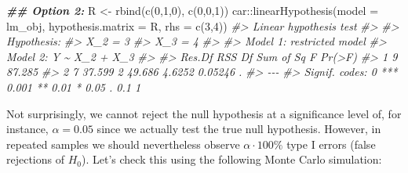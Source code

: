 \documentclass[
  14pt,
]{memoir}
\newenvironment{Shaded}{\begin{snugshade}}{\end{snugshade}}
\newcommand{\AttributeTok}[1]{\textcolor[rgb]{0.77,0.63,0.00}{#1}}
\newcommand{\CommentTok}[1]{\textcolor[rgb]{0.56,0.35,0.01}{\textit{#1}}}
\newcommand{\DecValTok}[1]{\textcolor[rgb]{0.00,0.00,0.81}{#1}}
\newcommand{\DocumentationTok}[1]{\textcolor[rgb]{0.56,0.35,0.01}{\textbf{\textit{#1}}}}
\newcommand{\FunctionTok}[1]{\textcolor[rgb]{0.00,0.00,0.00}{#1}}
\newcommand{\NormalTok}[1]{#1}
\newcommand{\OtherTok}[1]{\textcolor[rgb]{0.56,0.35,0.01}{#1}}
\newcommand{\SpecialCharTok}[1]{\textcolor[rgb]{0.00,0.00,0.00}{#1}}
\begin{document}
\begin{Shaded}
\begin{Highlighting}[]
\DocumentationTok{\#\# Option 2:}
\NormalTok{R }\OtherTok{\textless{}{-}} \FunctionTok{rbind}\NormalTok{(}\FunctionTok{c}\NormalTok{(}\DecValTok{0}\NormalTok{,}\DecValTok{1}\NormalTok{,}\DecValTok{0}\NormalTok{),}
           \FunctionTok{c}\NormalTok{(}\DecValTok{0}\NormalTok{,}\DecValTok{0}\NormalTok{,}\DecValTok{1}\NormalTok{))}
\NormalTok{car}\SpecialCharTok{::}\FunctionTok{linearHypothesis}\NormalTok{(}\AttributeTok{model =}\NormalTok{ lm\_obj, }
                      \AttributeTok{hypothesis.matrix =}\NormalTok{ R, }
                      \AttributeTok{rhs =} \FunctionTok{c}\NormalTok{(}\DecValTok{3}\NormalTok{,}\DecValTok{4}\NormalTok{))}
\CommentTok{\#\textgreater{} Linear hypothesis test}
\CommentTok{\#\textgreater{} }
\CommentTok{\#\textgreater{} Hypothesis:}
\CommentTok{\#\textgreater{} X\_2 = 3}
\CommentTok{\#\textgreater{} X\_3 = 4}
\CommentTok{\#\textgreater{} }
\CommentTok{\#\textgreater{} Model 1: restricted model}
\CommentTok{\#\textgreater{} Model 2: Y \textasciitilde{} X\_2 + X\_3}
\CommentTok{\#\textgreater{} }
\CommentTok{\#\textgreater{}   Res.Df    RSS Df Sum of Sq      F  Pr(\textgreater{}F)  }
\CommentTok{\#\textgreater{} 1      9 87.285                              }
\CommentTok{\#\textgreater{} 2      7 37.599  2    49.686 4.6252 0.05246 .}
\CommentTok{\#\textgreater{} {-}{-}{-}}
\CommentTok{\#\textgreater{} Signif. codes:  0 \textquotesingle{}***\textquotesingle{} 0.001 \textquotesingle{}**\textquotesingle{} 0.01 \textquotesingle{}*\textquotesingle{} 0.05 \textquotesingle{}.\textquotesingle{} 0.1 \textquotesingle{} \textquotesingle{} 1}
\end{Highlighting}
\end{Shaded}

Not surprisingly, we cannot reject the null hypothesis at a significance level of, for instance, \(\alpha=0.05\) since we actually test the true null hypothesis. However, in repeated samples we should nevertheless observe \(\alpha\cdot 100\%\) type I errors (false rejections of \(H_0\)). Let's check this using the following Monte Carlo simulation:
\end{document}
